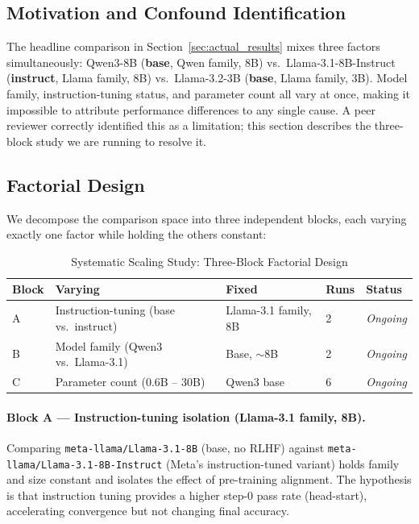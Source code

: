 \documentclass[12pt,a4paper]{report}
\theoremstyle{definition}
\begin{document}
\subsection{Motivation and Confound Identification}

The headline comparison in Section~\ref{sec:actual_results} mixes three factors simultaneously: Qwen3-8B (\textbf{base}, Qwen family, 8B) vs.\ Llama-3.1-8B-Instruct (\textbf{instruct}, Llama family, 8B) vs.\ Llama-3.2-3B (\textbf{base}, Llama family, 3B).  Model family, instruction-tuning status, and parameter count all vary at once, making it impossible to attribute performance differences to any single cause.  A peer reviewer correctly identified this as a limitation; this section describes the three-block study we are running to resolve it.

\subsection{Factorial Design}

We decompose the comparison space into three independent blocks, each varying exactly one factor while holding the others constant:

\begin{table}[htbp]
\centering
\caption{Systematic Scaling Study: Three-Block Factorial Design}
\label{tab:systematic_design}
\begin{tabular}{lllll}
\toprule
\textbf{Block} & \textbf{Varying} & \textbf{Fixed} & \textbf{Runs} & \textbf{Status} \\
\midrule
A & Instruction-tuning (base vs.\ instruct) & Llama-3.1 family, 8B & 2 & \textit{Ongoing} \\
B & Model family (Qwen3 vs.\ Llama-3.1)    & Base, $\sim$8B        & 2 & \textit{Ongoing} \\
C & Parameter count (0.6B -- 30B)           & Qwen3 base            & 6 & \textit{Ongoing} \\
\bottomrule
\end{tabular}
\end{table}

\paragraph{Block A --- Instruction-tuning isolation (Llama-3.1 family, 8B).}
Comparing \texttt{meta-llama/Llama-3.1-8B} (base, no RLHF) against \texttt{meta-llama/Llama-3.1-8B-Instruct} (Meta's instruction-tuned variant) holds family and size constant and isolates the effect of pre-training alignment.  The hypothesis is that instruction tuning provides a higher step-0 pass rate (head-start), accelerating convergence but not changing final accuracy.
\end{document}

